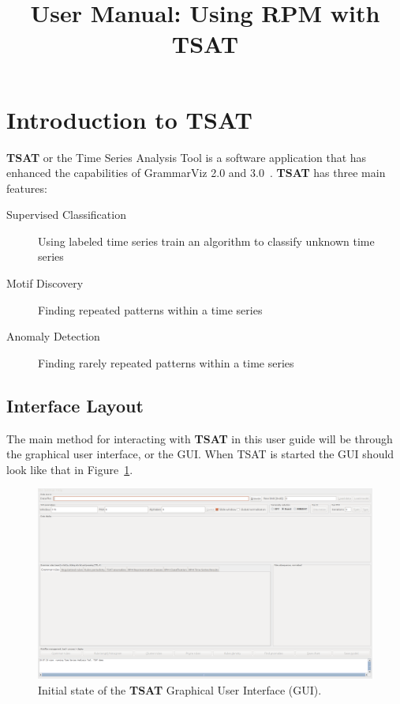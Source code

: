\documentclass[letterpaper, 12pt]{article}
\newcommand\TSAT{\textbf{TSAT}}
\begin{document}
\title{User Manual: Using RPM with TSAT}
\maketitle
\tableofcontents
\newpage

\section{Introduction to TSAT}


{\TSAT} or the Time Series Analysis Tool is a software application that has enhanced the capabilities of GrammarViz 2.0 and 3.0~\cite{senin-anomaly,senin-gv2,senin-gv3}.  {\TSAT} has three main features:
\begin{description}
	\item[Supervised Classification] Using labeled time series train an algorithm to classify unknown time series
	\item[Motif Discovery] Finding repeated patterns within a time series
	\item[Anomaly Detection] Finding rarely repeated patterns within a time series
\end{description}

\subsection{Interface Layout}
The main method for interacting with {\TSAT} in this user guide will be through the graphical user interface, or the GUI.  When TSAT is started the GUI should look like that in Figure~\ref{fig:tsat-interface}.

\begin{figure}[H]
	\includegraphics[width=\textwidth]{pictures/TSAT-interface}
	\caption{Initial state of the {\TSAT} Graphical User Interface (GUI).}
	\label{fig:tsat-interface}
\end{figure}
\end{document}
